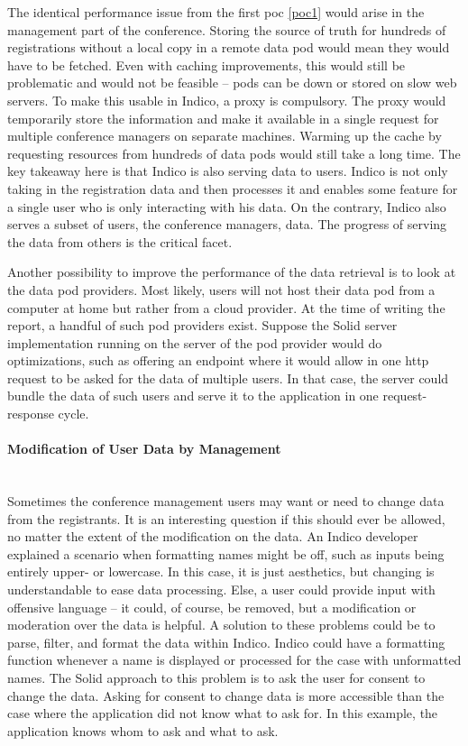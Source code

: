 The identical performance issue from the first \gls{poc} \ref{poc1} would arise in the management part of the conference. Storing the source of truth for hundreds of registrations without a local copy in a remote data pod would mean they would have to be fetched. Even with caching improvements, this would still be problematic and would not be feasible -- pods can be down or stored on slow web servers. To make this usable in Indico, a proxy is compulsory. The proxy would temporarily store the information and make it available in a single request for multiple conference managers on separate machines. Warming up the cache by requesting resources from hundreds of data pods would still take a long time. The key takeaway here is that Indico is also serving data to users. Indico is not only taking in the registration data and then processes it and enables some feature for a single user who is only interacting with his data. On the contrary, Indico also serves a subset of users, the conference managers, data. The progress of serving the data from others is the critical facet.

Another possibility to improve the performance of the data retrieval is to look at the data pod providers. Most likely, users will not host their data pod from a computer at home but rather from a cloud provider. At the time of writing the report, a handful of such pod providers exist. Suppose the Solid server implementation running on the server of the pod provider would do optimizations, such as offering an endpoint where it would allow in one \gls{http} request to be asked for the data of multiple users. In that case, the server could bundle the data of such users and serve it to the application in one request-response cycle.
\vspace{0.5cm}
\paragraph{Modification of User Data by Management}\mbox{}\\

Sometimes the conference management users may want or need to change data from the registrants. It is an interesting question if this should ever be allowed, no matter the extent of the modification on the data. An Indico developer explained a scenario when formatting names might be off, such as inputs being entirely upper- or lowercase. In this case, it is just aesthetics, but changing is understandable to ease data processing. Else, a user could provide input with offensive language -- it could, of course, be removed, but a modification or moderation over the data is helpful. A solution to these problems could be to parse, filter, and format the data within Indico. Indico could have a formatting function whenever a name is displayed or processed for the case with unformatted names. The Solid approach to this problem is to ask the user for consent to change the data. Asking for consent to change data is more accessible than the case where the application did not know what to ask for. In this example, the application knows whom to ask and what to ask.
